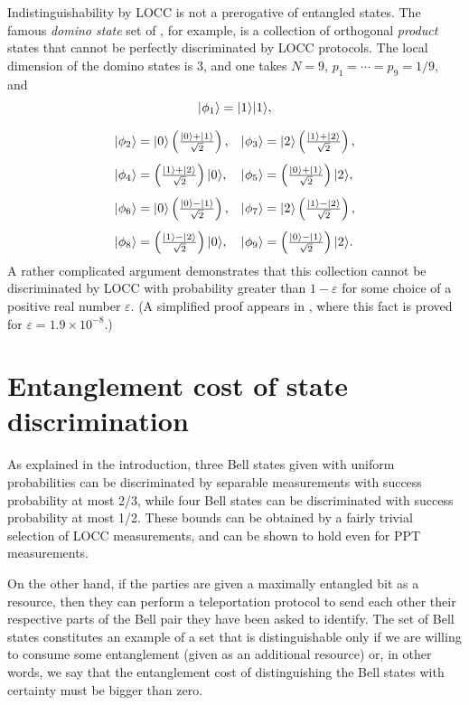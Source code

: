 Indistinguishability by LOCC is not a prerogative of entangled states. 
The famous \emph{domino state} set of \cite{Bennett99}, for example, is a 
collection of orthogonal \emph{product} states that cannot be perfectly 
discriminated by LOCC protocols.
The local dimension of the domino states is $3$, and one takes
$N = 9$, $p_1 = \cdots = p_9 = 1/9$, and
{\setlength{\arraycolsep}{2.5mm}%
\begin{equation} \label{eq:domino}
\begin{array}{ll}
  \multicolumn{2}{c}{\ket{\phi_1} = \ket{1}\ket{1},}\\[4mm]
  \ket{\phi_2} = \ket{0}\left(\frac{\ket{0} + \ket{1}}{\sqrt{2}}\right),
  & \ket{\phi_3} = \ket{2}\left(\frac{\ket{1} + \ket{2}}{\sqrt{2}}\right),
  \\[4mm]
  \ket{\phi_4} = \left(\frac{\ket{1} + \ket{2}}{\sqrt{2}}\right)\ket{0},
  & \ket{\phi_5} = \left(\frac{\ket{0} + \ket{1}}{\sqrt{2}}\right)\ket{2},
  \\[4mm]
  \ket{\phi_6} = \ket{0}\left(\frac{\ket{0} - \ket{1}}{\sqrt{2}}\right),
  & \ket{\phi_7} = \ket{2}\left(\frac{\ket{1} - \ket{2}}{\sqrt{2}}\right),
  \\[4mm]
  \ket{\phi_8} = \left(\frac{\ket{1} - \ket{2}}{\sqrt{2}}\right)\ket{0},
  & \ket{\phi_9} = \left(\frac{\ket{0} - \ket{1}}{\sqrt{2}}\right)\ket{2}.
\end{array}
\end{equation}
}%
A rather complicated argument demonstrates that this collection cannot be
discriminated by LOCC with probability greater than $1 - \varepsilon$ for some choice
of a positive real number $\varepsilon$.
(A simplified proof appears in \cite{Childs13}, where this fact
is proved for $\varepsilon = 1.9 \times 10^{-8}$.)



\section{Entanglement cost of state discrimination}

As explained in the introduction, three Bell states given with uniform
probabilities can be discriminated by separable measurements with success
probability at most 2/3, while four Bell states can be discriminated with success
probability at most 1/2.
These bounds can be obtained by a fairly trivial selection of LOCC
measurements, and can be shown to hold even for PPT measurements.

On the other hand, if the parties are given a maximally entangled bit as a resource,
then they can perform a teleportation protocol to send each other their respective parts of 
the Bell pair they have been asked to identify.
The set of Bell states constitutes an example of a set that is distinguishable only if we 
are willing to consume some entanglement (given as an additional resource) or, in other words, 
we say that the entanglement cost of distinguishing the Bell states with certainty 
must be bigger than zero.

